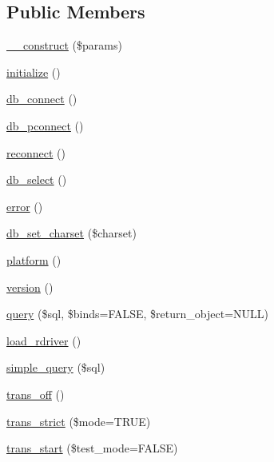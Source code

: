 \subsection*{Public Members}
\begin{DoxyCompactItemize}
\item 
\mbox{\hyperlink{class_c_i___d_b__driver_a9162320adff1a1a4afd7f2372f753a3e}{\+\_\+\+\_\+construct}} (\$params)
\item 
\mbox{\hyperlink{class_c_i___d_b__driver_a91098fa7d1917ce4833f284bbef12627}{initialize}} ()
\item 
\mbox{\hyperlink{class_c_i___d_b__driver_a6aa545dcb7768f0b62d37cdcf7f09adc}{db\+\_\+connect}} ()
\item 
\mbox{\hyperlink{class_c_i___d_b__driver_a0f69e662bd02de5bcf98647068e7c653}{db\+\_\+pconnect}} ()
\item 
\mbox{\hyperlink{class_c_i___d_b__driver_a57c19c642ab3023e28d10c50f86ff0a8}{reconnect}} ()
\item 
\mbox{\hyperlink{class_c_i___d_b__driver_af0c7f2602586ea2050b19fb36baefb24}{db\+\_\+select}} ()
\item 
\mbox{\hyperlink{class_c_i___d_b__driver_a43b8d30b879d4f09ceb059b02af2bc02}{error}} ()
\item 
\mbox{\hyperlink{class_c_i___d_b__driver_a66d47c23180629f6ccea934fd2ab6d0e}{db\+\_\+set\+\_\+charset}} (\$charset)
\item 
\mbox{\hyperlink{class_c_i___d_b__driver_ad69bddb2ba31b27415484b3da4213ba8}{platform}} ()
\item 
\mbox{\hyperlink{class_c_i___d_b__driver_a6080dae0886626b9a4cedb29240708b1}{version}} ()
\item 
\mbox{\hyperlink{class_c_i___d_b__driver_a4711d63638a755f763352472063f0bbf}{query}} (\$sql, \$binds=F\+A\+L\+SE, \$return\+\_\+object=N\+U\+LL)
\item 
\mbox{\hyperlink{class_c_i___d_b__driver_a0bd509a0088f09f4bbfbcbbe78bc3547}{load\+\_\+rdriver}} ()
\item 
\mbox{\hyperlink{class_c_i___d_b__driver_a6ac4d82d7ba4e8df07e1367229084c91}{simple\+\_\+query}} (\$sql)
\item 
\mbox{\hyperlink{class_c_i___d_b__driver_ae9080ca6b0a9a258f5e87750b266e337}{trans\+\_\+off}} ()
\item 
\mbox{\hyperlink{class_c_i___d_b__driver_a648f8e6b3d0c53ce2afd63cfcea1fe74}{trans\+\_\+strict}} (\$mode=T\+R\+UE)
\item 
\mbox{\hyperlink{class_c_i___d_b__driver_ab082d21c9a77398c6d6705d9e978fb20}{trans\+\_\+start}} (\$test\+\_\+mode=F\+A\+L\+SE)

\end{DoxyCompactItemize}
